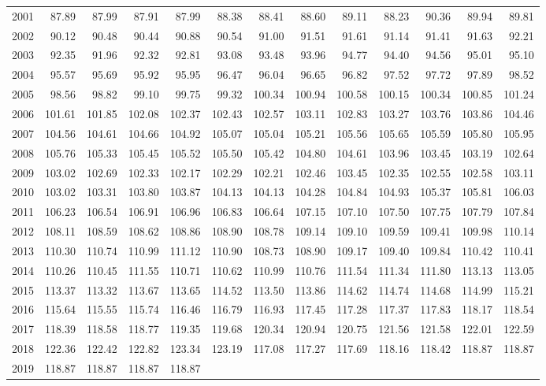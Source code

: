 \begin{longtable}{rrrrrrrrrrrrr}
  2001 & 87.89 & 87.99 & 87.91 & 87.99 & 88.38 & 88.41 & 88.60 & 89.11 & 88.23 & 90.36 & 89.94 & 89.81 \\ 
  2002 & 90.12 & 90.48 & 90.44 & 90.88 & 90.54 & 91.00 & 91.51 & 91.61 & 91.14 & 91.41 & 91.63 & 92.21 \\ 
  2003 & 92.35 & 91.96 & 92.32 & 92.81 & 93.08 & 93.48 & 93.96 & 94.77 & 94.40 & 94.56 & 95.01 & 95.10 \\ 
  2004 & 95.57 & 95.69 & 95.92 & 95.95 & 96.47 & 96.04 & 96.65 & 96.82 & 97.52 & 97.72 & 97.89 & 98.52 \\ 
  2005 & 98.56 & 98.82 & 99.10 & 99.75 & 99.32 & 100.34 & 100.94 & 100.58 & 100.15 & 100.34 & 100.85 & 101.24 \\ 
  2006 & 101.61 & 101.85 & 102.08 & 102.37 & 102.43 & 102.57 & 103.11 & 102.83 & 103.27 & 103.76 & 103.86 & 104.46 \\ 
  2007 & 104.56 & 104.61 & 104.66 & 104.92 & 105.07 & 105.04 & 105.21 & 105.56 & 105.65 & 105.59 & 105.80 & 105.95 \\ 
  2008 & 105.76 & 105.33 & 105.45 & 105.52 & 105.50 & 105.42 & 104.80 & 104.61 & 103.96 & 103.45 & 103.19 & 102.64 \\ 
  2009 & 103.02 & 102.69 & 102.33 & 102.17 & 102.29 & 102.21 & 102.46 & 103.45 & 102.35 & 102.55 & 102.58 & 103.11 \\ 
  2010 & 103.02 & 103.31 & 103.80 & 103.87 & 104.13 & 104.13 & 104.28 & 104.84 & 104.93 & 105.37 & 105.81 & 106.03 \\ 
  2011 & 106.23 & 106.54 & 106.91 & 106.96 & 106.83 & 106.64 & 107.15 & 107.10 & 107.50 & 107.75 & 107.79 & 107.84 \\ 
  2012 & 108.11 & 108.59 & 108.62 & 108.86 & 108.90 & 108.78 & 109.14 & 109.10 & 109.59 & 109.41 & 109.98 & 110.14 \\ 
  2013 & 110.30 & 110.74 & 110.99 & 111.12 & 110.90 & 108.73 & 108.90 & 109.17 & 109.40 & 109.84 & 110.42 & 110.41 \\ 
  2014 & 110.26 & 110.45 & 111.55 & 110.71 & 110.62 & 110.99 & 110.76 & 111.54 & 111.34 & 111.80 & 113.13 & 113.05 \\ 
  2015 & 113.37 & 113.32 & 113.67 & 113.65 & 114.52 & 113.50 & 113.86 & 114.62 & 114.74 & 114.68 & 114.99 & 115.21 \\ 
  2016 & 115.64 & 115.55 & 115.74 & 116.46 & 116.79 & 116.93 & 117.45 & 117.28 & 117.37 & 117.83 & 118.17 & 118.54 \\ 
  2017 & 118.39 & 118.58 & 118.77 & 119.35 & 119.68 & 120.34 & 120.94 & 120.75 & 121.56 & 121.58 & 122.01 & 122.59 \\ 
  2018 & 122.36 & 122.42 & 122.82 & 123.34 & 123.19 & 117.08 & 117.27 & 117.69 & 118.16 & 118.42 & 118.87 & 118.87 \\ 
  2019 & 118.87 & 118.87 & 118.87 & 118.87 &  &  &  &  &  &  &  &  \\ 
   \hline
\hline
\end{longtable}
